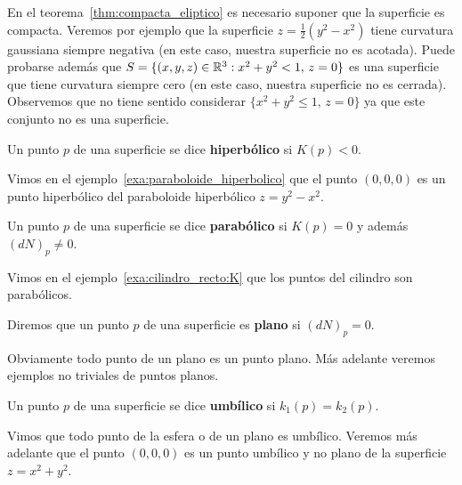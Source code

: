 En el teorema~\ref{thm:compacta_eliptico} es necesario suponer que la
superficie es compacta.  Veremos por ejemplo que la superficie
$z=\frac12(y^2-x^2)$ tiene curvatura gaussiana siempre negativa (en este caso,
nuestra superficie no es acotada).  Puede probarse además que
$S=\{(x,y,z)\in\mathbb{R}^3:x^2+y^2<1,\,z=0\}$ es una superficie que tiene curvatura
siempre cero (en este caso, nuestra superficie no es cerrada). Observemos que
no tiene sentido considerar $\{x^2+y^2\leq 1,\,z=0\}$ ya que este conjunto no
es una superficie.

\begin{definition}
	Un punto $p$ de una superficie se dice \textbf{hiperbólico} si $K(p)<0$. 
\end{definition}

Vimos en el ejemplo~\ref{exa:paraboloide_hiperbolico} que el punto $(0,0,0)$ es
un punto hiperbólico del paraboloide hiperbólico $z=y^2-x^2$. 

\begin{definition}
	Un punto $p$ de una superficie se dice \textbf{parabólico} si $K(p)=0$ y
	además $(dN)_p\ne 0$. 
\end{definition}

Vimos en el ejemplo~\ref{exa:cilindro_recto:K} que los puntos del cilindro son
parabólicos.

\begin{definition}
	Diremos que un punto $p$ de una superficie es \textbf{plano} si 
	$(dN)_p=0$. 
\end{definition}

Obviamente todo punto de un plano es un punto plano. Más adelante veremos
ejemplos no triviales de puntos planos. 
%
%	

\begin{definition}
	Un punto $p$ de una superficie se dice \textbf{umbílico} si $k_1(p)=k_2(p)$. 
\end{definition}

Vimos que todo punto de la esfera o de un plano es umbílico. Veremos más
adelante que el punto $(0,0,0)$ es un punto umbílico y no plano de la
superficie $z=x^2+y^2$.

